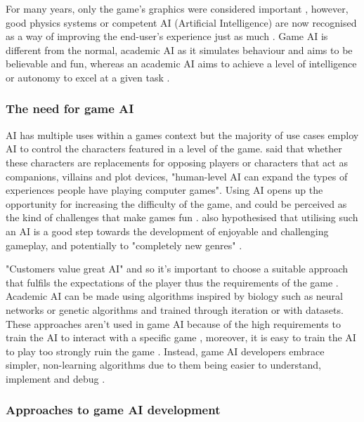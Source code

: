\documentclass[11pt, a4paper]{article}
\begin{document}
For many years, only the game's graphics were considered important \parencites{yap2002grid, blow2004game}, however, good physics systems or competent AI (Artificial Intelligence) are now recognised as a way of improving the end-user's experience just as much \parencite{blow2004game}. Game AI is different from the normal, academic AI as it simulates behaviour and aims to be believable and fun, whereas an academic AI aims to achieve a level of intelligence or autonomy to excel at a given task \parencite[60]{nareyek2004ai}.

\subsubsection{The need for game AI}
\label{subsubsec:theNeedForGameAI}

AI has multiple uses within a games context but the majority of use cases employ AI to control the characters featured in a level of the game. \citeauthor{laird2001human} \parencite*[16]{laird2001human} said that whether these characters are replacements for opposing players or characters that act as companions, villains and plot devices, "human-level AI can expand the types of experiences people have playing computer games". Using AI opens up the opportunity for increasing the difficulty of the game, and could be perceived as the kind of challenges that make games fun \parencite[2]{buro2004call}. \citeauthor{laird2001human} \parencite*[16]{laird2001human} also hypothesised that utilising such an AI is a good step towards the development of enjoyable and challenging gameplay, and potentially to "completely new genres" \parencite[17]{laird2001human}.

 "Customers value great AI" \parencite[60]{nareyek2004ai} and so it's important to choose a suitable approach that fulfils the expectations of the player thus the requirements of the game \parencite[19]{millington2019ai}. Academic AI can be made using algorithms inspired by biology such as neural networks or genetic algorithms and trained through iteration or with datasets. These approaches aren't used in game AI because of the high requirements to train the AI to interact with a specific game \parencite[64]{nareyek2004ai}, moreover, it is easy to train the AI to play too strongly ruin the game \parencite[13]{tozour2002evolution}. Instead, game AI developers embrace simpler, non-learning algorithms due to them being easier to understand, implement and debug \parencite[7]{tozour2002evolution}.

\subsubsection{Approaches to game AI development}
\label{subsubsec:approachesToGameAIDevelopment}
\end{document}
